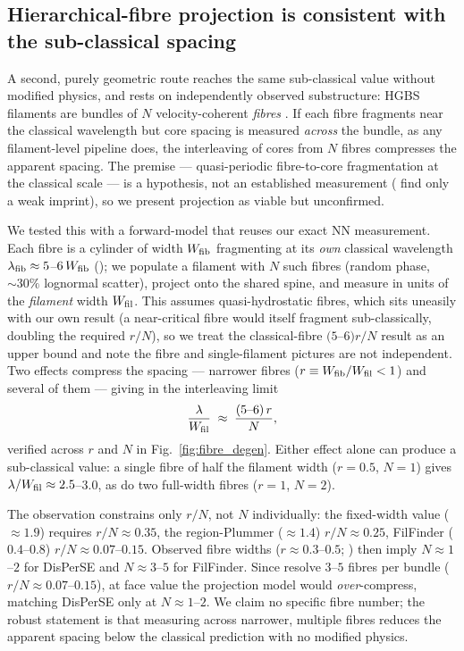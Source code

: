 \documentclass[usenatbib,twoside,twocolumn]{mnras}
\begin{document}
\subsection{Hierarchical-fibre projection is consistent with the sub-classical spacing}
\label{sec:fibre_projection}

A second, purely geometric route reaches the same sub-classical value without modified physics, and rests on independently observed substructure: HGBS filaments are bundles of $N$ velocity-coherent \emph{fibres} \citep{Hacar2013,Hacar2018,Yang2024}. If each fibre fragments near the classical wavelength but core spacing is measured \emph{across} the bundle, as any filament-level pipeline does, the interleaving of cores from $N$ fibres compresses the apparent spacing. The premise --- quasi-periodic fibre-to-core fragmentation at the classical scale --- is a hypothesis, not an established measurement (\citealt{Yang2024} find only a weak imprint), so we present projection as viable but unconfirmed.

We tested this with a forward-model that reuses our exact NN measurement. Each fibre is a cylinder of width $W_{\rm fib}$ fragmenting at its \emph{own} classical wavelength $\lambda_{\rm fib}\approx5$--$6\,W_{\rm fib}$ (\citealt{Fischera2012}); we populate a filament with $N$ such fibres (random phase, $\sim30\%$ lognormal scatter), project onto the shared spine, and measure in units of the \emph{filament} width $W_{\rm fil}$. This assumes quasi-hydrostatic fibres, which sits uneasily with our own result (a near-critical fibre would itself fragment sub-classically, doubling the required $r/N$), so we treat the classical-fibre $(5$--$6)r/N$ result as an upper bound and note the fibre and single-filament pictures are not independent. Two effects compress the spacing --- narrower fibres ($r\equiv W_{\rm fib}/W_{\rm fil}<1$) and several of them --- giving in the interleaving limit
\begin{equation}
\frac{\lambda}{W_{\rm fil}} \;\approx\; \frac{(5\text{--}6)\,r}{N},
\label{eq:fourrn}
\end{equation}
verified across $r$ and $N$ in Fig.~\ref{fig:fibre_degen}. Either effect alone can produce a sub-classical value: a single fibre of half the filament width ($r=0.5$, $N=1$) gives $\lambda/W_{\rm fil}\approx2.5$--$3.0$, as do two full-width fibres ($r=1$, $N=2$).

The observation constrains only $r/N$, not $N$ individually: the fixed-width value ($\approx1.9$) requires $r/N\approx0.35$, the region-Plummer ($\approx1.4$) $r/N\approx0.25$, FilFinder ($0.4$--$0.8$) $r/N\approx0.07$--$0.15$. Observed fibre widths ($r\approx0.3$--$0.5$; \citealt{Hacar2013,Hacar2018}) then imply $N\approx1$--$2$ for DisPerSE and $N\approx3$--$5$ for FilFinder. Since \citet{Hacar2013} resolve $3$--$5$ fibres per bundle ($r/N\approx0.07$--$0.15$), at face value the projection model would \emph{over}-compress, matching DisPerSE only at $N\approx1$--$2$. We claim no specific fibre number; the robust statement is that measuring across narrower, multiple fibres reduces the apparent spacing below the classical prediction with no modified physics.
\end{document}

